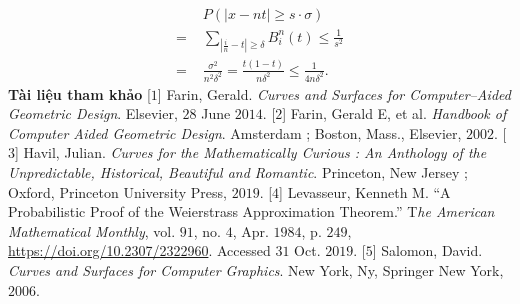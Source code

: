 \begin{multicols}{2}
\begin{align*}
			&P\left(|x- nt| \ge s \cdot \sigma\right)\\
			= \,\,&\sum\limits_{\left| {\frac{i}{n} - t} \right| \ge \delta } {B_i^n(t)}  \le \frac{1}{{{s^2}}} \\
			= \,\,&\frac{{{\sigma ^2}}}{{{n^2}{\delta ^2}}} = \frac{{t(1 - t)}}{{n{\delta ^2}}} \le \frac{1}{{4n{\delta ^2}}}.
		\end{align*}
		\textbf{\color{toanhocdoisong}Tài liệu tham khảo}
		\vskip 0.1cm
		[$1$] Farin, Gerald. \textit{Curves and Surfaces for Computer--Aided Geometric Design}. Elsevier, $28$ June $2014$.
		\vskip 0.1cm
		[$2$] Farin, Gerald E, et al. \textit{Handbook of Computer Aided Geometric Design}. Amsterdam ; Boston, Mass., Elsevier, $2002$.
		\vskip 0.1cm
		[$3$] Havil, Julian. \textit{Curves for the Mathematically Curious : An Anthology of the Unpredictable, Historical, Beautiful and Romantic}. Princeton, New Jersey ; Oxford, Princeton University Press, $2019$.
		\vskip 0.1cm
		[$4$] Levasseur, Kenneth M. ``A Probabilistic Proof of the Weierstrass Approximation Theorem.'' T\textit{he American Mathematical Monthly}, vol. $91$, no. $4$, Apr. $1984$, p. $249$, \url{https://doi.org/10.2307/2322960}. Accessed $31$ Oct. $2019$.
		\vskip 0.1cm
		[$5$] Salomon, David. \textit{Curves and Surfaces for Computer Graphics}. New York, Ny, Springer New York, $2006$.
	\end{multicols}